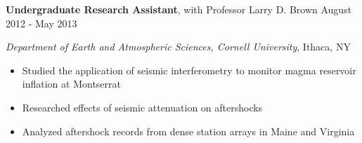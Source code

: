 
\vspace{7pt}

\textbf{Undergraduate Research Assistant}, with Professor Larry D. Brown \hfill August 2012 - May 2013

\textit{Department of Earth and Atmospheric Sciences, Cornell University}, Ithaca, NY

\begin{itemize}
    \item Studied the application of seismic interferometry to monitor magma reservoir inflation at Montserrat
    \item Researched effects of seismic attenuation on aftershocks
    \item Analyzed aftershock records from dense station arrays in Maine and Virginia
\end{itemize}
